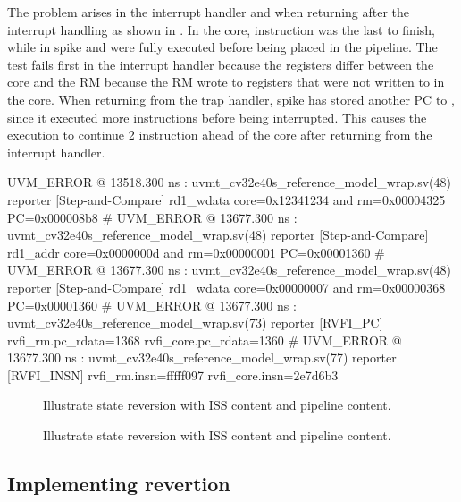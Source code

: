 The problem arises in the interrupt handler and when returning after the interrupt handling as shown in .
In the core, instruction  was the last to finish, while in spike  and  were fully executed before being placed in the pipeline. The test fails first in the interrupt handler because the registers differ between the core and the RM because the RM wrote to registers that were not written to in the core. When returning from the trap handler, spike has stored another PC to , since it executed more instructions before being interrupted. This causes the execution to continue 2 instruction ahead of the core after returning from the interrupt handler. 


\begin{terminal}[caption={Errors from division test.}, label={lst:divtest_error}]
UVM_ERROR @ 13518.300 ns : uvmt_cv32e40s_reference_model_wrap.sv(48) reporter [Step-and-Compare] rd1_wdata core=0x12341234 and rm=0x00004325 PC=0x000008b8
# UVM_ERROR @ 13677.300 ns : uvmt_cv32e40s_reference_model_wrap.sv(48) reporter [Step-and-Compare] rd1_addr core=0x0000000d and rm=0x00000001 PC=0x00001360
# UVM_ERROR @ 13677.300 ns : uvmt_cv32e40s_reference_model_wrap.sv(48) reporter [Step-and-Compare] rd1_wdata core=0x00000007 and rm=0x00000368 PC=0x00001360
# UVM_ERROR @ 13677.300 ns : uvmt_cv32e40s_reference_model_wrap.sv(73) reporter [RVFI_PC] rvfi_rm.pc_rdata=1368 rvfi_core.pc_rdata=1360
# UVM_ERROR @ 13677.300 ns : uvmt_cv32e40s_reference_model_wrap.sv(77) reporter [RVFI_INSN] rvfi_rm.insn=fffff097 rvfi_core.insn=2e7d6b3
\end{terminal}


\begin{figure}[htb]
\centering

\caption{Illustrate state reversion with ISS content and pipeline content.}
\label{fig:interrupt_revert_addi}
\end{figure}

\begin{figure}[htb]
\centering

\caption{ Illustrate state reversion with ISS content and pipeline content.}
\label{fig:interrupt_revert_divu}
\end{figure}

\subsection{Implementing revertion}

